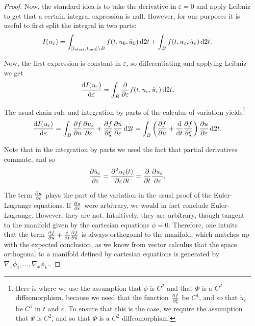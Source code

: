 \documentclass{article}
\theoremstyle{plain}
\theoremstyle{plain}
\theoremstyle{nonumberplain}
\newtheorem{proof}{Proof}
\theoremstyle{empty}
\newcommand{\tstart}{\mathrm{start}}
\newcommand{\tend}{\mathrm{end}}
\begin{document}
\begin{proof}
Now, the standard idea is to take the derivative in $\varepsilon = 0$ and apply Leibniz to get that a certain integral expression is null. However, for our purposes it is useful to first split the integral in two parts:
\[I(u_\varepsilon) = \int_{[t_\tstart,t_\tend] \setminus B} f(t,u_0,\dot u_0) \dl2 t + \int_B f(t,u_\varepsilon, \dot u_\varepsilon) \dl2 t.\]

Now, the first expression is constant in $\varepsilon$, so differentiating and applying Leibniz we get
\[\diff{I(u_\varepsilon)}\varepsilon = \int_B \diffp*{f(t,u_\varepsilon, \dot u_\varepsilon)}\varepsilon \dl2 t.\]

The usual chain rule and integration by parts of the calculus of variation yields\footnote{Here is where we use the assumption that $\phi$ is $C^2$ and that $\Phi$ is a $C^2$ diffeomorphism, because we need that the function $\diffp f \xi$ be $C^1$, and so that $\dot u_\varepsilon$ be $C^1$ in $t$ and $\varepsilon$. To ensure that this is the case, we require the assumption that $\Psi$ is $C^2$, and so that $\Phi$ is a $C^2$ diffeomorphism.}
\[
\diff{I(u_\varepsilon)}\varepsilon = \int_B \diffp f u \diffp{u_\varepsilon}\varepsilon + \diffp f {\xi} \diffp{\dot u}\varepsilon \dl2 t = \int_B \left( \diffp f u + \diff*{\diffp f {\xi}}t \right) \diffp{u}\varepsilon \dl2 t.
\]

Note that in the integration by parts we used the fact that partial derivatives commute, and so
\[\diffp{\dot u_\varepsilon}\varepsilon = \diffp{u_\varepsilon(t)}{\varepsilon,t} = \diffp*{\diffp {u_\varepsilon} \varepsilon}t.\]

The term $\diffp u \varepsilon$ plays the part of the variation in the usual proof of the Euler-Lagrange equations. If $\diffp u \varepsilon$ were arbitrary, we would in fact conclude Euler-Lagrange. However, they are not. Intuitively, they are arbitrary, though tangent to the manifold given by the cartesian equations $\phi = 0$. Therefore, one intuits that the term $\diffp f u + \diff*{\diffp f {\dot u}}t$ is always orthogonal to the manifold, which matches up with the expected conclusion, as we know from vector calculus that the space orthogonal to a manifold defined by cartesian equations is generated by $\nabla_x \phi_1, \dots, \nabla_x \phi_k$..


\end{proof}
\end{document}
